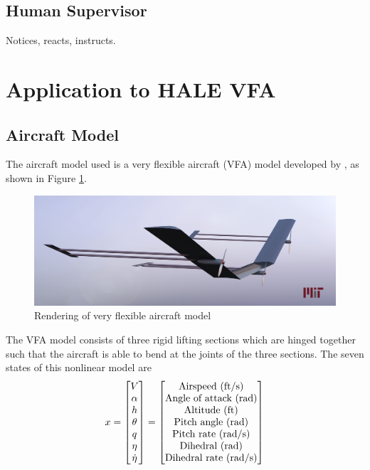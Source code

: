 \documentclass[english]{ifacconf}
\begin{document}
\subsection{Human Supervisor}\label{subsec:sc_human}
Notices, reacts, instructs.

\section{Application to HALE VFA}
\subsection{Aircraft Model}
The aircraft model used is a very flexible aircraft (VFA) model developed by \cite{gibson2011modeling}, as shown in Figure \ref{fig:vfa}. 
\begin{figure}[htbp]
	\centering
	\includegraphics[width=0.95\columnwidth]{../fig/VFA_16.jpg}
	\caption{Rendering of very flexible aircraft model}
	\label{fig:vfa}
\end{figure}

The VFA model consists of three rigid lifting sections which are hinged together such that the aircraft is able to bend at the joints of the three sections. The seven states of this nonlinear model are
\begin{equation}
x = \begin{bmatrix}
V \\
\alpha \\
h \\
\theta \\
q\\
\eta\\
\dot{\eta}
\end{bmatrix} =
\begin{bmatrix}
	 $Airspeed (ft/s)$\\ $Angle of attack (rad)$\\ $Altitude (ft)$\\ $Pitch angle (rad)$\\ $Pitch rate (rad/s)$\\ $Dihedral (rad)$\\ $Dihedral rate (rad/s)$
\end{bmatrix}
\end{equation}
\end{document}
